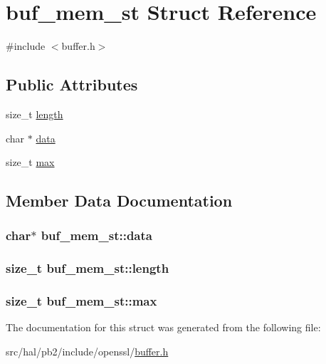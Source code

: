 \hypertarget{structbuf__mem__st}{}\section{buf\+\_\+mem\+\_\+st Struct Reference}
\label{structbuf__mem__st}


{\ttfamily \#include $<$buffer.\+h$>$}

\subsection*{Public Attributes}
\begin{DoxyCompactItemize}
\item 
size\+\_\+t \hyperlink{structbuf__mem__st_aa2bd5895b125d1b8f3ec5db5914abf21}{length}
\item 
char $\ast$ \hyperlink{structbuf__mem__st_aff3f0a4329a4dccdc9d08eaf4223e95c}{data}
\item 
size\+\_\+t \hyperlink{structbuf__mem__st_a300f344aae77102e18dde58449b18ed3}{max}
\end{DoxyCompactItemize}


\subsection{Member Data Documentation}
\subsubsection[{\texorpdfstring{data}{data}}]{\setlength{\rightskip}{0pt plus 5cm}char$\ast$ buf\+\_\+mem\+\_\+st\+::data}\hypertarget{structbuf__mem__st_aff3f0a4329a4dccdc9d08eaf4223e95c}{}\label{structbuf__mem__st_aff3f0a4329a4dccdc9d08eaf4223e95c}
\subsubsection[{\texorpdfstring{length}{length}}]{\setlength{\rightskip}{0pt plus 5cm}size\+\_\+t buf\+\_\+mem\+\_\+st\+::length}\hypertarget{structbuf__mem__st_aa2bd5895b125d1b8f3ec5db5914abf21}{}\label{structbuf__mem__st_aa2bd5895b125d1b8f3ec5db5914abf21}
\subsubsection[{\texorpdfstring{max}{max}}]{\setlength{\rightskip}{0pt plus 5cm}size\+\_\+t buf\+\_\+mem\+\_\+st\+::max}\hypertarget{structbuf__mem__st_a300f344aae77102e18dde58449b18ed3}{}\label{structbuf__mem__st_a300f344aae77102e18dde58449b18ed3}


The documentation for this struct was generated from the following file\+:\begin{DoxyCompactItemize}
\item 
src/hal/pb2/include/openssl/\hyperlink{buffer_8h}{buffer.\+h}\end{DoxyCompactItemize}
